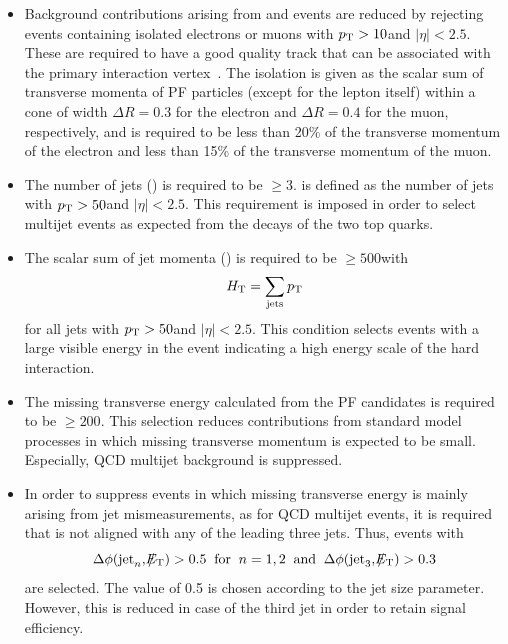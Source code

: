 \begin{itemize}
 \item{Background contributions arising from \ttbar and \WJets events are reduced by rejecting events containing isolated electrons or muons with $p_{\text{T}} > 10$\gev and $|\eta| < 2.5$. These are required to have a good quality track that can be associated with the primary interaction vertex~\cite{CMS-PAS-EGM-10-004, CMS-PAS-MUO-10-002}. The isolation is given as the scalar sum of transverse momenta of PF particles (except for the lepton itself) within a cone of width $\Delta R = 0.3$ for the electron and $\Delta R = 0.4$ for the muon, respectively, and is required to be less than 20\% of the transverse momentum of the electron and less than 15\% of the transverse momentum of the muon.}
 \item{The number of jets (\NJets) is required to be $\ge 3$. \NJets is defined as the number of jets with $p_{\text{T}} > 50$\gev and $|\eta| < 2.5$. This requirement is imposed in order to select multijet events as expected from the decays of the two top quarks.}
 \item{The scalar sum of jet momenta (\HT) is required to be $\ge 500$\gev with 
\begin{equation*}
H_{\text{T}} = \sum_{\mathrm{jets}} p_{\text{T}} 
\end{equation*}
for all jets with $p_{\text{T}} > 50$\gev and $|\eta| < 2.5$. This condition selects events with a large visible energy in the event indicating a high energy scale of the hard interaction.}   
 \item{The missing transverse energy \met calculated from the PF candidates is required to be $\ge 200$\gev. This selection reduces contributions from standard model processes in which missing transverse momentum is expected to be small. Especially, QCD multijet background is suppressed. } 
 \item{In order to suppress events in which missing transverse energy is mainly arising from jet mismeasurements, as for QCD multijet events, it is required that \met is not aligned with any of the leading three jets. Thus, events with
\begin{equation*}
\Delta \phi(\mathrm{jet}_n, \slash\mkern-12mu{E}_{\text{T}}) > 0.5 \;\; \mathrm{for} \;\; n = 1,2 \;\; \mathrm{and} \;\; \Delta \phi(\mathrm{jet}_3, \slash\mkern-12mu{E}_{\text{T}}) > 0.3
\end{equation*} 
are selected. The value of 0.5 is chosen according to the jet size parameter. However, this is reduced in case of the third jet in order to retain signal efficiency. }
\end{itemize}
